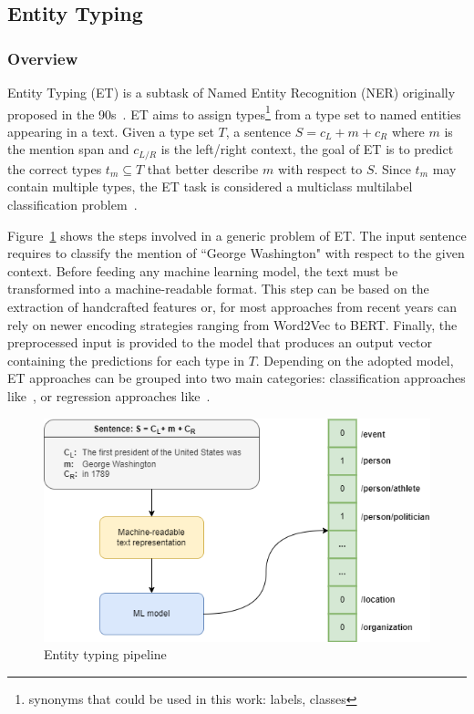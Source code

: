 \subsection{Entity Typing} \label{entity_typing}
\subsubsection{Overview}
Entity Typing (ET) is a subtask of Named Entity Recognition (NER) originally proposed in the 90s~\cite{MUC6}. ET aims to assign types\footnote{synonyms that could be used in this work: labels, classes} from a type set to named entities appearing in a text. Given a type set $T$, a sentence $S = c_{L} + m + c_{R} $ where $m$ is the mention span and $c_{L/R}$ is the left/right context, the goal of ET is to predict the correct types $t_{m} \subseteq T $ that better describe $m$ with respect to $S$. Since $t_{m}$ may contain multiple types, the ET task is considered a multiclass multilabel classification problem~\cite{lopez2020fully}.

Figure~\ref{fig:et_pipeline} shows the steps involved in a generic problem of ET. The input sentence requires to classify the mention of ``George Washington" with respect to the given context. Before feeding any machine learning model, the text must be transformed into a machine-readable format. This step can be based on the extraction of handcrafted features or, for most approaches from recent years can rely on newer encoding strategies ranging from Word2Vec to BERT. Finally, the preprocessed input is provided to the model that produces an output vector containing the predictions for each type in $T$. Depending on the adopted model, ET approaches can be grouped into two main categories: classification approaches like~\cite{yosef-etal-2012-hyena, Ling2012FineGrainedER, shimaoka2016attentive, choi, xu-barbosa-2018-neural}, or regression approaches like~\cite{yogatama-etal-2015-embedding, abhishek-etal-2017-fine, lopez-etal-2019-fine, ren-etal-2016-afet}.

\begin{figure}[H]
    \centering
    \includegraphics[width=.8\linewidth]{figures/et_pipeline.png}
    \caption{ Entity typing pipeline }
    \label{fig:et_pipeline}
\end{figure}

